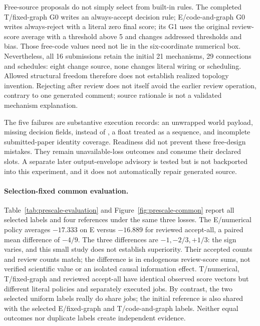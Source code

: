 Free-source proposals do not simply select from built-in rules. The completed
T/fixed-graph G0 writes an always-accept decision rule; E/code-and-graph G0
writes always-reject with a literal zero final score; its G1 uses the original
review-score average with a threshold above 5 and changes addressed thresholds
and bias. Those free-code values need not lie in the six-coordinate numerical
box. Nevertheless, all 16 submissions retain the initial 21 mechanisms,
29 connections and schedules: eight change source, none changes literal
wiring or scheduling. Allowed structural freedom therefore does not establish
realized topology invention. Rejecting after review does not itself avoid the
earlier review operation, contrary to one generated comment; source rationale
is not a validated mechanism explanation.

The five failures are substantive execution records: an unwrapped world
payload, missing decision fields,  instead of
, a float treated as a sequence, and incomplete submitted-paper
identity coverage. Readiness did not prevent these free-design mistakes.
They remain unavailable-loss outcomes and consume their declared slots.
A separate later output-envelope advisory is tested but is not backported
into this experiment, and it does not automatically repair generated source.

\paragraph{Selection-fixed common evaluation.}
Table~\ref{tab:prescale-evaluation} and Figure~\ref{fig:prescale-common}
report all selected labels and four references under the same three losses.
The E/numerical policy averages $-17.333$ on E versus $-16.889$ for reviewed
accept-all, a paired mean difference of $-4/9$. The three differences are
$-1,-2/3,+1/3$: the sign varies, and this small study does not establish
superiority. Their accepted counts and review counts match; the difference
is in endogenous review-score sums, not verified scientific value or an
isolated causal information effect. T/numerical, T/fixed-graph and reviewed
accept-all have identical observed score vectors but different literal
policies and separately executed jobs. By contrast, the two selected uniform
labels really do share jobs; the initial reference is also shared with the
selected E/fixed-graph and T/code-and-graph labels. Neither equal outcomes
nor duplicate labels create independent evidence.

